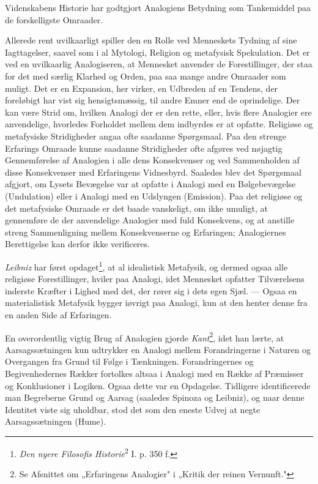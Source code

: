 \documentclass[12pt,a4paper]{book}
\newcommand{\apage}[1]{\marginnote{\footnotesize\textit{[#1]}}}
\begin{document}
Videnskabens Historie har godtgjort Analogiens Betydning som
Tankemiddel paa de forskelligste Omraader.

Allerede rent uvilkaarligt spiller den en Rolle ved Menneskets Tydning
af sine Iagttagelser, saavel som i al Mytologi, Religion og metafysisk
Spekulation. Det er ved en uvilkaarlig Analogiseren, at Mennesket
anvender de Forestillinger, der staa for det med særlig Klarhed og
Orden, paa saa mange andre Omraader som muligt. Det er en Expansion,
her virker, en Udbreden af en Tendens, der foreløbigt har vist sig
hensigtsmæssig, til andre Emner end de oprindelige. Der kan være Strid
om, hvilken Analogi der er den rette, eller, hvis flere Analogier ere
anvendelige, hvorledes Forholdet mellem dem indbyrdes er at opfatte.
Religiøse og metafysiske Stridigheder angaa ofte saadanne Spørgsmaal.
Paa den strenge Erfarings Omraade kunne saadanne Stridigheder ofte
afgøres ved nøjagtig Gennemførelse af Analogien i alle dens Konsekvenser
og ved Sammenholden af disse Konsekvenser med Erfaringens Vidnesbyrd.
Saaledes blev \apage{183} det Spørgsmaal afgjort, om Lysets Bevægelse var at opfatte
i Analogi med en Bølgebevægelse (Undulation) eller i Analogi med en
Udslyngen (Emission). Paa det religiøse og det metafysiske Omraade er
det baade vanskeligt, om ikke umuligt, at gennemføre de der anvendelige
Analogier med fuld Konsekvens, og at anstille streng Sammenligning
mellem Konsekvenserne og Erfaringen; Analogiernes Berettigelse kan
derfor ikke verificeres.

\emph{Leibniz} har først opdaget\footnote{\emph{Den nyere Filosofis
Historie}\textsuperscript{2} I. p. 350 f.}, at al idealistisk Metafysik,
og dermed ogsaa alle religiøse Forestillinger, hviler paa Analogi, idet
Mennesket opfatter Tilværelsens inderste Kræfter i Lighed med det, der
rører sig i dets egen Sjæl. --- Ogsaa en materialistisk Metafysik bygger
iøvrigt paa Analogi, kun at den henter denne fra en anden Side af
Erfaringen.

En overordentlig vigtig Brug af Analogien gjorde \emph{Kant}\footnote{Se
Afsnittet om „Erfaringens Analogier" i „Kritik der reinen Vernunft."},
idet han lærte, at Aarsagssætningen kun udtrykker en Analogi mellem
Forandringerne i Naturen og Overgangen fra Grund til Følge i Tænkningen.
Forandringernes og Begivenhedernes Rækker fortolkes altsaa i Analogi med
en Række af Præmisser og Konklusioner i Logiken. Ogsaa dette var en
Opdagelse. Tidligere identificerede man Begreberne Grund og Aarsag
(saaledes Spinoza og Leibniz), og naar denne Identitet viste sig
uholdbar, stod det som den eneste Udvej at negte Aarsagssætningen
(Hume).
\end{document}
